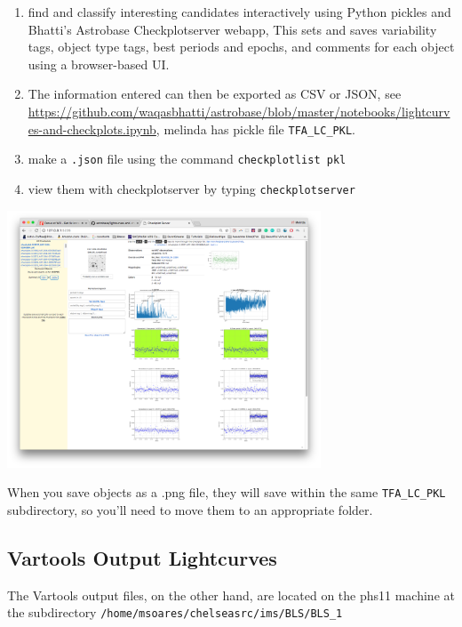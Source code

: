\begin{enumerate}
    \item find and classify interesting candidates interactively using Python pickles and Bhatti's Astrobase Checkplotserver webapp, This sets and saves variability tags, object type tags, best periods and epochs, and comments for each object using a browser-based UI.
   
    \item The information entered can then be exported as CSV or JSON, see \url{https://github.com/waqasbhatti/astrobase/blob/master/notebooks/lightcurves-and-checkplots.ipynb}, melinda has pickle file \texttt{TFA\_LC\_PKL}.
    
    \item make a \texttt{.json} file using the command \texttt{checkplotlist pkl}
    
    \item view them with checkplotserver by typing \texttt{checkplotserver}
\end{enumerate}

\begin{center}
\includegraphics[width=0.7\textwidth]{melinda/checkplotserver.png}\\
\end{center}
When you save objects as a .png file, they will save within the same \texttt{TFA\_LC\_PKL} subdirectory, so you'll need to move them to an appropriate folder. 


\subsection*{Vartools Output Lightcurves}
The Vartools output files, on the other hand, are located on the phs11 machine at the subdirectory \texttt{/home/msoares/chelseasrc/ims/BLS/BLS_1}

